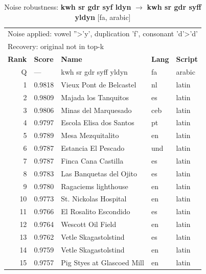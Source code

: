 \begin{table}[htbp]
\centering
\small
\caption{Noise robustness: \textbf{kwh sr gdr syf ldyn} $\rightarrow$ \textbf{kwh sr gdr syff yldyn} [fa, arabic]}
\label{tab:noise-35}
\begin{tabular}{rllll}
\toprule
\multicolumn{5}{l}{\small Noise applied: vowel ''>'y', duplication 'f', consonant 'd'>'d'} \\
\multicolumn{5}{l}{\small Recovery: original not in top-k} \\
\midrule
\textbf{Rank} & \textbf{Score} & \textbf{Name} & \textbf{Lang} & \textbf{Script} \\
\midrule
\rowcolor{gray!20} Q & --- & kwh sr gdr syff yldyn & fa & arabic \\
\midrule
1 & 0.9818 & Vieux Pont de Belcastel & nl & latin \\
2 & 0.9809 & Majada los Tanquitos & es & latin \\
3 & 0.9806 & Minas del Marquesado & ceb & latin \\
4 & 0.9797 & Escola Elisa dos Santos & pt & latin \\
5 & 0.9789 & Mesa Mezquitalito & en & latin \\
6 & 0.9787 & Estancia El Pescado & und & latin \\
7 & 0.9787 & Finca Cana Castilla & es & latin \\
8 & 0.9783 & Las Banquetas del Ojito & es & latin \\
9 & 0.9780 & Ragaciems lighthouse & en & latin \\
10 & 0.9773 & St. Nickolas Hospital & en & latin \\
11 & 0.9766 & El Rosalito Escondido & es & latin \\
12 & 0.9764 & Wescott Oil Field & en & latin \\
13 & 0.9762 & Vetle Skagastolstind & es & latin \\
14 & 0.9759 & Vetle Skagastolstind & en & latin \\
15 & 0.9757 & Pig Styes at Glascoed Mill & en & latin \\
\bottomrule
\end{tabular}
\end{table}

